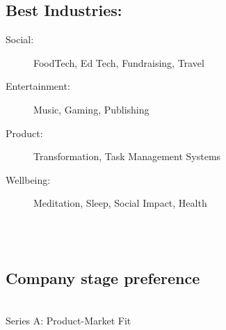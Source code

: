 {{\subsection*{%
Best Industries:
}
\begin{description}
\item[Social:]
FoodTech,
Ed Tech,
Fundraising,
Travel %
\item[Entertainment:] Music,
Gaming,
Publishing
\item[Product:]
Transformation,
Task Management Systems
\item[Wellbeing:] Meditation, Sleep, Social Impact, Health %
\end{description}
\\ \\
\subsection*{Company stage preference}     \\
Series A:
Product-Market Fit






    }%
}

